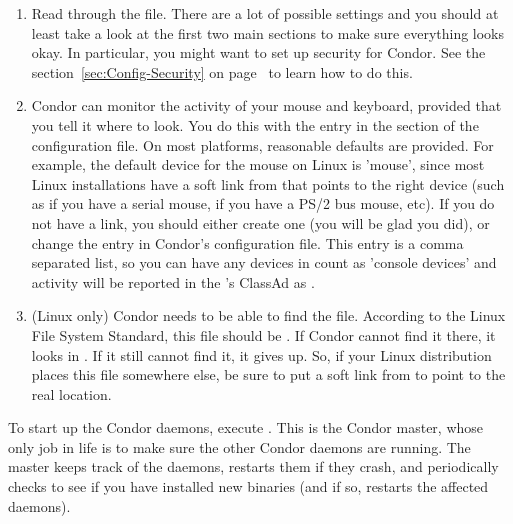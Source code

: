 \begin{enumerate}
\item Read through the  file.  There are a
    lot of possible settings and you should at least take a look at
    the first two main sections to make sure everything looks okay.
    In particular, you might want to set up security for
    Condor.  See the section~\ref{sec:Config-Security} on
    page~\pageref{sec:Config-Security} to learn how to do this.

\item Condor can monitor the activity of your mouse and keyboard,
    provided that you tell it where to look.  You do this with the
     entry in the  section of
    the configuration file.  On most platforms, reasonable
    defaults are provided.
    For example, the default device for the mouse on Linux
    is 'mouse', since most Linux installations have a soft link from
     that points to the right device (such as
     if you have a serial mouse,  if you have
    a PS/2 bus mouse, etc).  If you do not have a 
    link, you should either create one (you will be glad you did), or
    change the  entry in Condor's
    configuration file.
    This entry is a comma separated list, so you can have any
    devices in  count as 'console devices' and activity
    will be reported in the 's ClassAd as
    .

\item  (Linux only) Condor needs to be able to find the  file.
    According to the Linux File System Standard, this file should be
    .  If Condor cannot find it there, it looks in
    .  If it still cannot find it, it gives up.  So, if
    your Linux distribution places this file somewhere else, be sure to
    put a soft link from  to point to the real location.

\end{enumerate}

To start up the Condor daemons, execute
.  This is the Condor master, whose
only job in life is to make sure the other Condor daemons are running.
The master keeps track of the daemons, restarts them if they crash,
and periodically checks to see if you have installed new binaries (and
if so, restarts the affected daemons).

